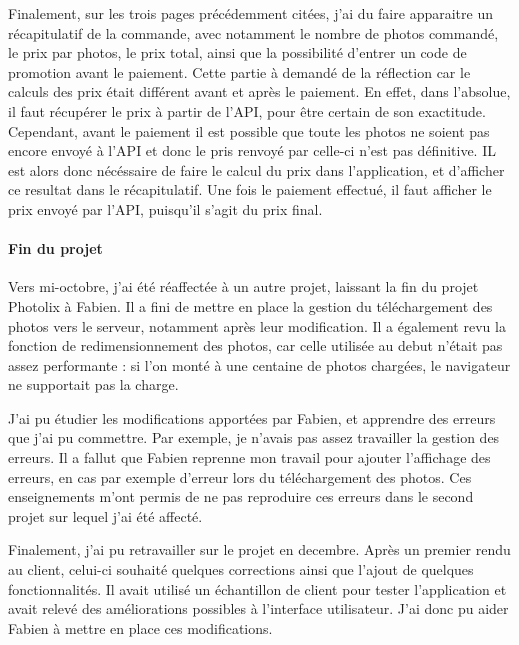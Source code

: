 Finalement, sur les trois pages précédemment citées, j'ai du faire
apparaitre un récapitulatif de la commande, avec notamment le nombre de
photos commandé, le prix par photos, le prix total, ainsi que la
possibilité d'entrer un code de promotion avant le paiement. Cette
partie à demandé de la réflection car le calculs des prix était
différent avant et après le paiement. En effet, dans l'absolue, il faut
récupérer le prix à partir de l'API, pour être certain de son
exactitude. Cependant, avant le paiement il est possible que toute les
photos ne soient pas encore envoyé à l'API et donc le pris renvoyé par
celle-ci n'est pas définitive. IL est alors donc nécéssaire de faire le
calcul du prix dans l'application, et d'afficher ce resultat dans le
récapitulatif. Une fois le paiement effectué, il faut afficher le prix
envoyé par l'API, puisqu'il s'agit du prix final.

\bigskip

\paragraph{Fin du projet}\label{fin-du-projet}

\bigskip

Vers mi-octobre, j'ai été réaffectée à un autre projet, laissant la fin
du projet Photolix à Fabien. Il a fini de mettre en place la gestion du
téléchargement des photos vers le serveur, notamment après leur
modification. Il a également revu la fonction de redimensionnement des
photos, car celle utilisée au debut n'était pas assez performante : si
l'on monté à une centaine de photos chargées, le navigateur ne
supportait pas la charge.

\bigskip

J'ai pu étudier les modifications apportées par Fabien, et apprendre des
erreurs que j'ai pu commettre. Par exemple, je n'avais pas assez
travailler la gestion des erreurs. Il a fallut que Fabien reprenne mon
travail pour ajouter l'affichage des erreurs, en cas par exemple
d'erreur lors du téléchargement des photos. Ces enseignements m'ont
permis de ne pas reproduire ces erreurs dans le second projet sur lequel
j'ai été affecté.

\bigskip

Finalement, j'ai pu retravailler sur le projet en decembre. Après un
premier rendu au client, celui-ci souhaité quelques corrections ainsi
que l'ajout de quelques fonctionnalités. Il avait utilisé un échantillon
de client pour tester l'application et avait relevé des améliorations
possibles à l'interface utilisateur. J'ai donc pu aider Fabien à mettre
en place ces modifications.

